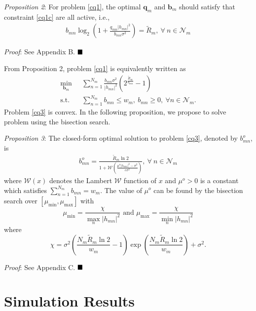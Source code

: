 \documentclass[journal]{IEEEtran}
\begin{document}
\textit{Proposition 2}: For problem \eqref{cq1}, the optimal $\mathbf{q}_m$ and $\mathbf{b}_m$ should satisfy that constraint \eqref{cq1c} are all active, i.e.,
\begin{align}
b_{mn}\log_2\left(1 + \frac{q_{mn}\left|h_{mn}\right|^2}{b_{mn}\sigma^2}\right)= \tilde{R}_m,\  \forall \ n\in\mathcal{N}_m
\end{align}

\textit{Proof}: See Appendix B. $\hfill\blacksquare$

From Proposition 2, problem \eqref{cq1} is equivalently written as
\begin{align}\label{cq3}
\min_{\mathbf{b}_{m}}\ & \sum\limits_{n= 1}^{N_m} \frac{b_{mn}\sigma^2}{\left|h_{mn}\right|^2}\left(2^{\frac{\tilde{R}_m}{b_{mn}}} - 1\right) \nonumber \\ \mbox{s.t.} \quad &  \sum\limits_{n=1}^{N_m} b_{mn} \leq w_m,\ b_{mn} \geq 0,\ \forall n\in\mathcal{N}_m.
\end{align}
Problem \eqref{cq3} is convex. In the following proposition, we propose to solve problem using the bisection search.

\textit{Proposition 3}: The closed-form optimal solution to problem \eqref{cq3}, denoted by $b_{mn}^o$, is
\begin{align}\label{cq4}
b_{mn}^o= \frac{\tilde{R}_m\ln2}{1 + \mathcal{W}\left(\frac{\mu^o\left|h_{mn}\right|^2 - \sigma^2}{e\sigma^2}\right)},\ \forall\ n\in\mathcal{N}_m
\end{align}
where $\mathcal{W}\left(x\right)$ denotes the Lambert $\mathcal{W}$ function of $x$ \cite{RMCorless} and $\mu^o>0$ is a constant which satisfies $\sum_{n=1}^{N_m} b_{mn}=w_m$. The value of $\mu^o$ can be found by the bisection search over $\left[\mu_{\min}, \mu_{\max}\right]$ with
\begin{equation}\label{cq5}
\mu_{\min}=\frac{\chi}{\max_n\left|h_{mn}\right|^2} \mbox{ and } \mu_{\max}=\frac{\chi}{\min_n\left|h_{mn}\right|^2}
\end{equation}
where
\begin{equation}
\chi=\sigma^2\left(\frac{N_m\tilde{R}_m\ln2}{w_m} - 1\right)\exp\left(\frac{N_m\tilde{R}_m\ln2}{w_m}\right) + \sigma^2.
\end{equation}

\textit{Proof}: See Appendix C.  $\hfill\blacksquare$

\section{Simulation Results}
\end{document}
